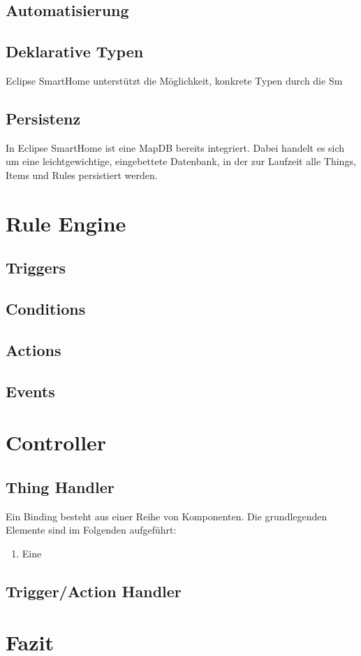 \subsection{Automatisierung}


\subsection{Deklarative Typen}
Eclipse SmartHome unterstützt die Möglichkeit, konkrete Typen durch die Sm

\subsection{Persistenz}
In Eclipse SmartHome ist eine MapDB bereits integriert. Dabei handelt es sich um eine leichtgewichtige, eingebettete Datenbank, in der zur Laufzeit alle Things, Items und Rules persistiert werden. 




\section{Rule Engine}
\subsection{Triggers}
\subsection{Conditions}
\subsection{Actions}
\subsection{Events}

\section{Controller}
\subsection{Thing Handler}
Ein Binding besteht aus einer Reihe von Komponenten. Die grundlegenden Elemente sind im Folgenden aufgeführt:

\begin{enumerate}
\item Eine
\end{enumerate}

\subsection{Trigger/Action Handler}

\section{Fazit}
